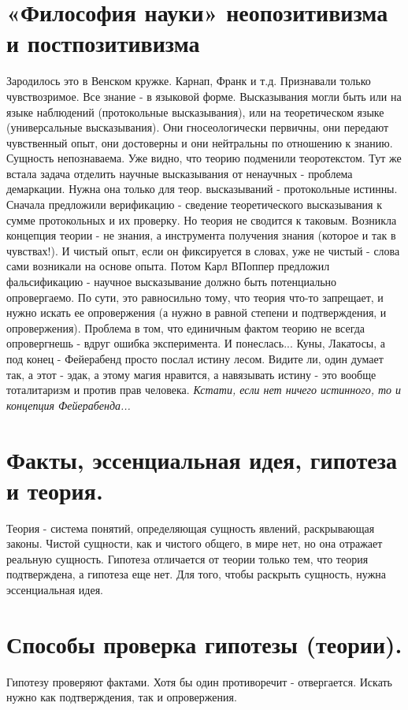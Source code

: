 \section{ «Философия науки» неопозитивизма и постпозитивизма }
Зародилось это в Венском кружке. Карнап, Франк и т.д. Признавали только чувствозримое. Все знание - в языковой форме. Высказывания могли быть или на языке наблюдений (протокольные высказывания), или на теоретическом языке (универсальные высказывания). Они %
 гносеологически первичны, они передают чувственный опыт, они достоверны и они нейтральны по отношению к знанию. Сущность непознаваема. Уже видно, что теорию подменили теоротекстом. Тут же встала задача отделить научные высказывания от ненаучных - проблема демаркации. Нужна она только для теор. высказываний - протокольные истинны. Сначала предложили верификацию - сведение теоретического высказывания к сумме протокольных и их проверку. Но теория не сводится к таковым. Возникла концепция теории - не знания, а инструмента получения знания (которое и так в чувствах!). И чистый опыт, если он фиксируется в словах, уже не чистый - слова сами возникали на основе опыта. Потом Карл ВПоппер предложил фальсификацию - научное высказывание должно быть потенциально опровергаемо. По сути, это равносильно тому, что теория что-то запрещает, и нужно искать ее опровержения (а нужно в равной степени и подтверждения, и опровержения). Проблема в том, что единичным фактом теорию не всегда опровергнешь - вдруг ошибка эксперимента. И понеслась... Куны, Лакатосы, а под конец - Фейерабенд просто послал истину лесом. Видите ли, один думает так, а этот - эдак, а этому магия нравится, а навязывать истину - это вообще тоталитаризм и против прав человека. \textit{Кстати, если нет ничего истинного, то и концепция Фейерабенда...}

\section{ Факты, эссенциальная идея, гипотеза и теория.}
Теория - система понятий, определяющая сущность явлений, раскрывающая законы. Чистой сущности, как и чистого общего, в мире нет, но она отражает реальную сущность. Гипотеза отличается от теории только тем, что теория подтверждена, а гипотеза еще нет. Для того, чтобы раскрыть сущность, нужна эссенциальная идея. 
 
\section{ Способы проверка гипотезы (теории).}
Гипотезу проверяют фактами. Хотя бы один противоречит - отвергается. Искать нужно как подтверждения, так и опровержения.

